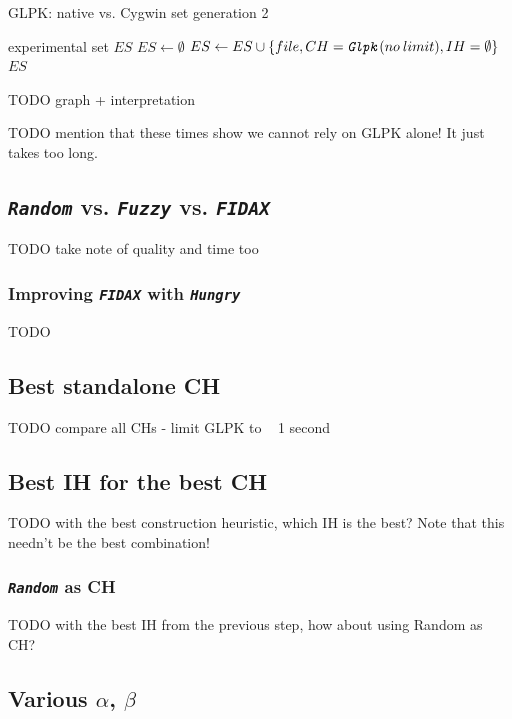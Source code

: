 \documentclass[a4paper,12pt,oneside]{report}
\newcommand{\jmodule}[1]{\texttt{\textit{#1}}}
\theoremstyle{definition}
\begin{document}
\begin{algorithm}
\caption{GLPK: native vs. Cygwin set generation 2}
\label{listing-experiment-glpk-native-vs-cygwin-2}
\begin{algorithmic}
\ENSURE experimental set $ES$
\STATE $ES \gets \emptyset$
    \STATE $ES \gets ES \cup \{file, CH = \jmodule{Glpk}(no\:limit), IH = \emptyset\}$  
  \ENDFOR
\ENDFOR
\RETURN $ES$
\end{algorithmic}
\end{algorithm}

TODO graph + interpretation

TODO mention that these times show we cannot rely on GLPK alone! It just takes too long.

\subsection{\jmodule{Random} vs. \jmodule{Fuzzy} vs. \jmodule{FIDAX}}

TODO take note of quality and time too

\subsubsection{Improving \jmodule{FIDAX} with \jmodule{Hungry}}

TODO

\subsection{Best standalone CH}

TODO compare all CHs - limit GLPK to ~ 1 second

\subsection{Best IH for the best CH}

TODO with the best construction heuristic, which IH is the best? Note that this needn't be the best combination!

\subsubsection{\jmodule{Random} as CH}

TODO with the best IH from the previous step, how about using Random as CH?

\subsection{Various $\alpha$, $\beta$}
\end{document}
